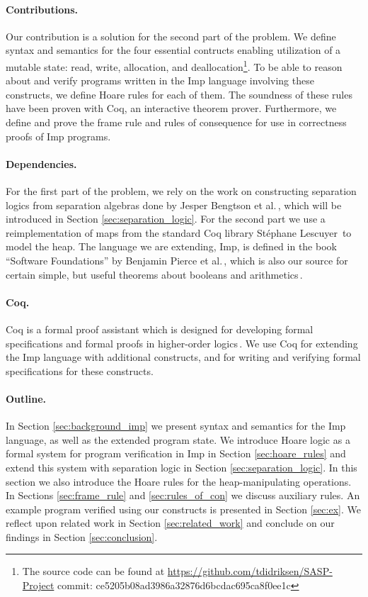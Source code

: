 \paragraph{Contributions.}
Our contribution is a solution for the second part of the problem. We define syntax and semantics for the four essential contructs enabling utilization of a mutable state: read, write, allocation, and deallocation\footnote{The source code can be found at \url{https://github.com/tdidriksen/SASP-Project} commit: ce5205b08ad3986a32876d6bcdac695ca8f0ee1c}. To be able to reason about and verify programs written in the Imp language involving these constructs, we define Hoare rules for each of them. The soundness of these rules have been proven with Coq, an interactive theorem prover. Furthermore, we define and prove the frame rule and rules of consequence for use in correctness proofs of Imp programs.

\paragraph{Dependencies.}
For the first part of the problem, we rely on the work on constructing separation logics from separation algebras done by Jesper Bengtson et al.\,\cite{BirkedalL:veroop-conf}, which will be introduced in Section \ref{sec:separation_logic}. For the second part we use a reimplementation of maps from the standard Coq library Stéphane Lescuyer\,\cite{CoqContainers} to model the heap. The language we are extending, Imp, is defined in the book ``Software Foundations'' by Benjamin Pierce et al.\,\cite{Pierce:SF}, which is also our source for certain simple, but useful theorems about booleans and arithmetics\,\cite{SfLib}.

\paragraph{Coq.}
Coq is a formal proof assistant which is designed for developing formal specifications and formal proofs in higher-order logics\,\cite{CoqIntro}. We use Coq for extending the Imp language with additional constructs, and for writing and verifying formal specifications for these constructs.

\paragraph{Outline.}
In Section \ref{sec:background_imp} we present syntax and semantics for the Imp language, as well as the extended program state. We introduce Hoare logic as a formal system for program verification in Imp in Section \ref{sec:hoare_rules} and extend this system with separation logic in Section \ref{sec:separation_logic}. In this section we also introduce the Hoare rules for the heap-manipulating operations. In Sections \ref{sec:frame_rule} and \ref{sec:rules_of_con} we discuss auxiliary rules. An example program verified using our constructs is presented in Section \ref{sec:ex}. We reflect upon related work in Section \ref{sec:related_work} and conclude on our findings in Section \ref{sec:conclusion}.